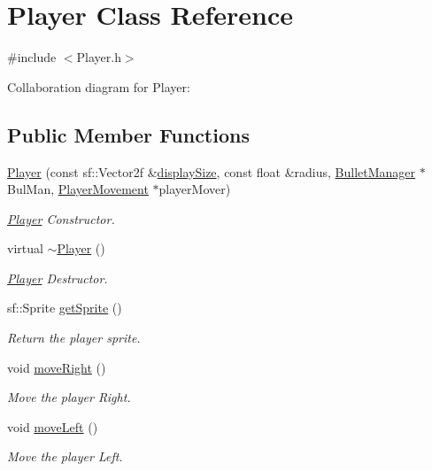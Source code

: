 \hypertarget{class_player}{}\section{Player Class Reference}
\label{class_player}


{\ttfamily \#include $<$Player.\+h$>$}



Collaboration diagram for Player\+:
\subsection*{Public Member Functions}
\begin{DoxyCompactItemize}
\item 
\hyperlink{class_player_a73caf03d79f04f53fe9d799bb5123c37}{Player} (const sf\+::\+Vector2f \&\hyperlink{_game_tests_8cpp_ac0230399c621da4679687e37351dba76}{display\+Size}, const float \&radius, \hyperlink{class_bullet_manager}{Bullet\+Manager} $\ast$Bul\+Man, \hyperlink{class_player_movement}{Player\+Movement} $\ast$player\+Mover)
\begin{DoxyCompactList}\small\item\em \hyperlink{class_player}{Player} Constructor. \end{DoxyCompactList}\item 
virtual \hyperlink{class_player_a749d2c00e1fe0f5c2746f7505a58c062}{$\sim$\+Player} ()
\begin{DoxyCompactList}\small\item\em \hyperlink{class_player}{Player} Destructor. \end{DoxyCompactList}\item 
sf\+::\+Sprite \hyperlink{class_player_aabef659f696be314cdb705a1ce77ec2a}{get\+Sprite} ()
\begin{DoxyCompactList}\small\item\em Return the player sprite. \end{DoxyCompactList}\item 
void \hyperlink{class_player_a6a2b68bc4b21d4c4a79a23b498896ec2}{move\+Right} ()
\begin{DoxyCompactList}\small\item\em Move the player Right. \end{DoxyCompactList}\item 
void \hyperlink{class_player_ae3bbcf1159bdc059bff1c2513f2505f7}{move\+Left} ()
\begin{DoxyCompactList}\small\item\em Move the player Left. \end{DoxyCompactList}\item 

\end{DoxyCompactItemize}
